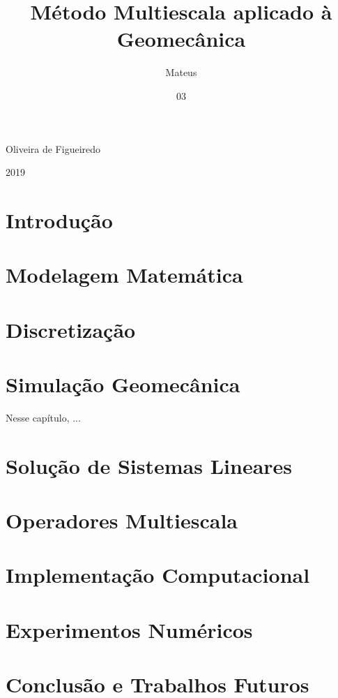 \documentclass[dsc,pdftex]{coppe}
\begin{document}
  \title{Método Multiescala aplicado à Geomecânica}
  \author{Mateus}{Oliveira de Figueiredo}
  \date{03}{2019}
  \maketitle

  \frontmatter
  \tableofcontents
  \listoffigures
  \listoftables
  \printlosymbols
  \printloabbreviations

  \mainmatter

  \chapter{Introdução}

  \chapter{Modelagem Matemática} \label{ch:modelagem}
  

  \chapter{Discretização} \label{ch:discretizacao}

  \chapter{Simulação Geomecânica}

  Nesse capítulo, ...

  \chapter{Solução de Sistemas Lineares}\label{ch:sistemas}
  

  \chapter{Operadores Multiescala}\label{ch:multiescala}
  

  \chapter{Implementação Computacional}\label{ch:implementacao}

  \chapter{Experimentos Numéricos}
  

  \chapter{Conclusão e Trabalhos Futuros}

  \backmatter
  \nocite{*}
  
  
  \appendix
  
  
\end{document}
